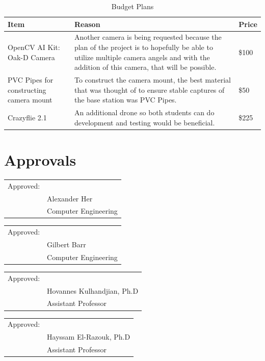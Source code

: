 \documentclass[12pt,onecolumn]{IEEEtran}			%
\begin{document}
 \begin{table}[h!]
\begin{center}
\begin{tabular}{| m{3cm} | m{13cm}| m{1cm} |} 
 \hline
  Item & Reason  & Price \\
 \hline
 OpenCV AI Kit: Oak-D Camera & Another camera is being requested because the plan of the project is to hopefully be able to utilize multiple camera angels and with the addition of this camera, that will be possible.  & \$100 \\
 \hline
 PVC Pipes for constructing camera mount & To construct the camera mount, the best material that was thought of to ensure stable captures of the base station was PVC Pipes. & \$50 \\
 \hline
 Crazyflie 2.1 & An additional drone so both students can do development and testing would be beneficial. & \$225 \\
 \hline
\end{tabular}
\end{center}
\caption{Budget Plans}
\label{Budget Table:2}
\end{table}
\vspace{12pt} 
 
 
 \section{Approvals}
\vspace{12pt} 
\vspace{12pt} 



\begin{tabular}{@{}p{.5in}p{4in}@{}}
Approved: & \hrulefill \\
& Alexander Her \\
& Computer Engineering\\
\end{tabular}
\vspace{12pt} 

\begin{tabular}{@{}p{.5in}p{4in}@{}}
Approved: & \hrulefill \\
& Gilbert Barr \\
& Computer Engineering\\
\end{tabular}
\vspace{12pt} 

\begin{tabular}{@{}p{.5in}p{4in}@{}}
Approved: & \hrulefill \\
& Hovannes Kulhandjian, Ph.D \\
& Assistant Professor\\
\end{tabular}
\vspace{12pt} 

\begin{tabular}{@{}p{.5in}p{4in}@{}}
Approved: & \hrulefill \\
& Hayssam El-Razouk, Ph.D \\
& Assistant Professor\\
\end{tabular}


\newpage
~\cite{lu2018survey}
~\cite{mishra2019introduction}
~\cite{shanmugamani2018deep}


 
\end{document}
